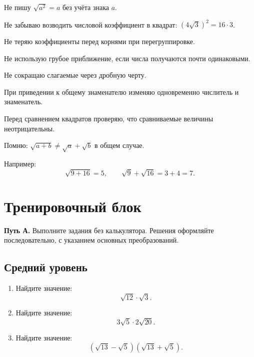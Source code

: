 \documentclass[a4paper,12pt]{article}
\begin{document}
\begin{checklist}
    \item Не пишу \(\sqrt{a^2}=a\) без учёта знака \(a\).
    \item Не забываю возводить числовой коэффициент в квадрат: \((4\sqrt3)^2=16\cdot3\).
    \item Не теряю коэффициенты перед корнями при перегруппировке.
    \item Не использую грубое приближение, если числа получаются почти одинаковыми.
    \item Не сокращаю слагаемые через дробную черту.
    \item При приведении к общему знаменателю изменяю одновременно числитель и знаменатель.
    \item Перед сравнением квадратов проверяю, что сравниваемые величины неотрицательны.
    \item Помню: \(\sqrt{a+b}\ne\sqrt a+\sqrt b\) в общем случае.
\end{checklist}

Например:
\[
\sqrt{9+16}=5,
\qquad
\sqrt9+\sqrt{16}=3+4=7.
\]

\clearpage
\section*{\color{darkaccent}Тренировочный блок}

\textbf{Путь А.}
Выполните задания без калькулятора. Решения оформляйте последовательно, с указанием основных преобразований.

\subsection*{\color{darkaccent}Средний уровень}
\begin{enumerate}
    \item Найдите значение:
    \[\sqrt{12}\cdot\sqrt3.\]

    \item Найдите значение:
    \[3\sqrt5\cdot2\sqrt{20}.\]

    \item Найдите значение:
    \[(\sqrt{13}-\sqrt5)(\sqrt{13}+\sqrt5).\]
\end{enumerate}
\end{document}
